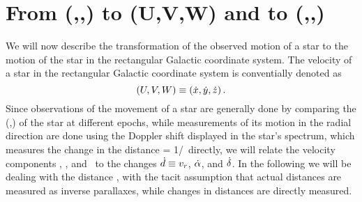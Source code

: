 \section{From (\vrr,\pmra,\pmdec) to (U,V,W) and to (\vrr,\pmll,\pmbb)}

We will now describe the transformation of the observed motion of a
star to the motion of the star in the rectangular Galactic coordinate
system. The velocity of a star in the rectangular Galactic coordinate
system is conventially denoted as
\begin{equation}
(U,V,W) \equiv (\dot{x},\dot{y},\dot{z})\, .
\end{equation}
Since observations of the movement of a star are generally done by
comparing the (\ra,\dec) of the star at different epochs, while
measurements of its motion in the radial direction are done using the
Doppler shift displayed in the star's spectrum, which measures the
change in the distance \radialdist = 1/\parallax\ directly, we will
relate the velocity components \galU, \galV, and \galW\ to the changes
$\dot{d} \equiv v_r$, $\dot{\alpha}$, and $\dot{\delta}$. In the following
we will be dealing with the distance \radialdist, with the tacit
assumption that actual distances are measured as inverse parallaxes,
while changes in distances are directly measured.

